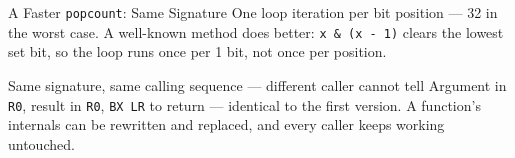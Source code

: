 \documentclass[9pt,aspectratio=169,xcolor=table]{beamer}
\begin{document}
\begin{frame}[fragile]{A Faster \texttt{popcount}: Same Signature}
    \leavevmode
    {\small One loop iteration per \alert{bit position} --- 32 in the worst
    case. A well-known method does better: \texttt{x \& (x - 1)} clears the
    \alert{lowest set bit}, so the loop runs once per 1 bit, not once per
    position.}

    \vspace{1mm}

\begin{block}{Same signature, same calling sequence --- different caller cannot tell}
    Argument in \texttt{R0}, result in \texttt{R0}, \texttt{BX LR} to return
    --- identical to the first version. A function's internals can be
    rewritten and replaced, and every caller keeps working untouched.
\end{block}
\end{frame}
\end{document}
